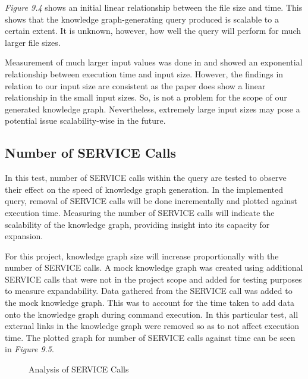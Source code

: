 \textit{Figure 9.4} shows an initial linear relationship between the file size and time. This shows that the knowledge graph-generating query produced is scalable to a certain extent. It is unknown, however, how well the query will perform for much larger file sizes. 

Measurement of much larger input values was done in \cite{sparqlanything} and showed an exponential relationship between execution time and input size. However, the findings in relation to our input size are consistent as the paper does show a linear relationship in the small input sizes. So, is not a problem for the scope of our generated knowledge graph. Nevertheless, extremely large input sizes may pose a potential issue scalability-wise in the future.

\subsection{Number of SERVICE Calls}
\hspace{0.5cm} In this test, number of SERVICE calls within the query are tested to observe their effect on the speed of knowledge graph generation. In the implemented query, removal of SERVICE calls will be done incrementally and plotted against execution time. Measuring the number of SERVICE calls will indicate the scalability of the knowledge graph, providing insight into its capacity for expansion.

For this project, knowledge graph size will increase proportionally with the number of SERVICE calls. A mock knowledge graph was created using additional SERVICE calls that were not in the project scope and added for testing purposes to measure expandability. Data gathered from the SERVICE call was added to the mock knowledge graph. This was to account for the time taken to add data onto the knowledge graph during command execution. In this particular test, all external links in the knowledge graph were removed so as to not affect execution time. The plotted graph for number of SERVICE calls against time can be seen in \textit{Figure 9.5}.

\begin{figure}[H]
\begin{center}
\end{center}
\vspace{-0.75cm}
\caption{Analysis of SERVICE Calls}
\end{figure}

